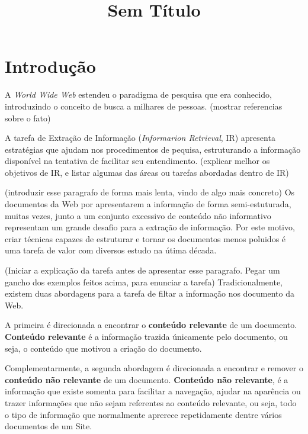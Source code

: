 \documentclass[12pt, a4paper]{article}
\newcommand{\remove}[1]{}
\begin{document}
\title{Sem Título}

\maketitle

\section{Introdução}

A {\it World Wide Web} estendeu o paradigma de pesquisa que era conhecido, 
	introduzindo o conceito de busca a milhares de pessoas. (mostrar
  referencias sobre o fato)


A tarefa de Extração de Informação ({\it Informarion Retrieval}, IR) apresenta 
	estratégias que ajudam nos procedimentos de pequisa, estruturando a 
	informação disponível na tentativa de facilitar seu entendimento.
  (explicar melhor os objetivos de IR, e listar algumas das áreas ou
  tarefas abordadas dentro de IR)

(introduzir esse paragrafo de forma mais lenta, vindo de algo mais
concreto)
Os documentos da Web por apresentarem a informação de forma semi-estuturada,
	muitas vezes, junto a um conjunto excessivo de conteúdo não informativo
	representam um grande desafio para a extração de informação. 
Por este motivo,
	criar técnicas capazes de estruturar e tornar os documentos menos poluidos
	é uma tarefa de valor com diversos estudo na útima década.

\remove{
Retirar uma parcela de informação não relevante desses documentos 
	proporciona benefícios claros.
}

(Iniciar a explicação da tarefa antes de apresentar esse paragrafo.
Pegar um gancho dos exemplos feitos acima, para enunciar a tarefa)
Tradicionalmente, existem duas abordagens para a tarefa de filtar a informação
nos documento da Web. 
  \remove{, diminuindo a quantidade de dados não informativos processados.}
A primeira é direcionada a encontrar o {\bf conteúdo relevante} de um 
	documento. {\bf Conteúdo relevante} é a informação trazida únicamente pelo 
	documento, ou seja,
		o conteúdo que motivou a criação do documento.

Complementarmente, a segunda abordagem é direcionada a encontrar e remover o 
	{\bf conteúdo não relevante} de um documento. {\bf Conteúdo não relevante},
	é a informação que existe somenta para facilitar a navegação,
	ajudar na aparência ou trazer informações que não sejam referentes ao 
	conteúdo relevante, ou seja,
		todo o tipo de informação que normalmente aprerece repetidamente 
		dentre vários documentos de um Site.
\end{document}
